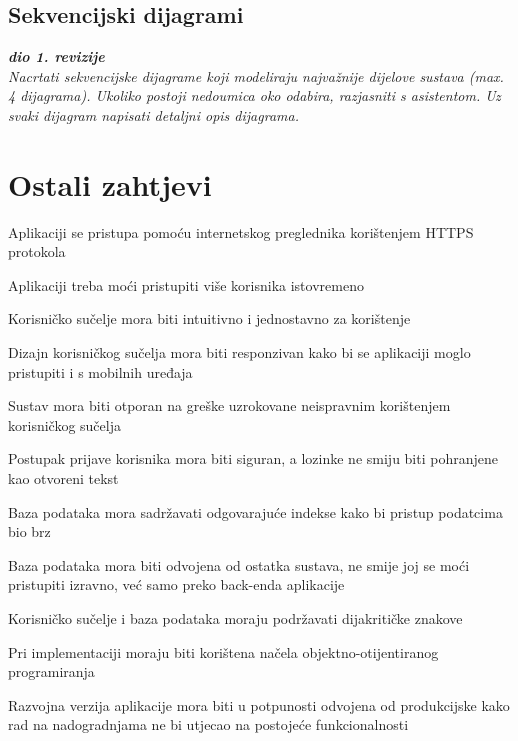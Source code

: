 			\subsection{Sekvencijski dijagrami}
				
				\textbf{\textit{dio 1. revizije}}\\
				
				\textit{Nacrtati sekvencijske dijagrame koji modeliraju najvažnije dijelove sustava (max. 4 dijagrama). Ukoliko postoji nedoumica oko odabira, razjasniti s asistentom. Uz svaki dijagram napisati detaljni opis dijagrama.}
				\eject
	
		\section{Ostali zahtjevi}
			 
			 \begin{packed_item}
			 	\item Aplikaciji se pristupa pomoću internetskog preglednika korištenjem HTTPS protokola
			 	\item Aplikaciji treba moći pristupiti više korisnika istovremeno
			 	\item Korisničko sučelje mora biti intuitivno i jednostavno za korištenje
			 	\item Dizajn korisničkog sučelja mora biti responzivan kako bi se aplikaciji moglo pristupiti i s mobilnih uređaja
			 	\item Sustav mora biti otporan na greške uzrokovane neispravnim korištenjem korisničkog sučelja
			 	\item Postupak prijave korisnika mora biti siguran, a lozinke ne smiju biti pohranjene kao otvoreni tekst
			 	\item Baza podataka mora sadržavati odgovarajuće indekse kako bi pristup podatcima bio brz
			 	\item Baza podataka mora biti odvojena od ostatka sustava, ne smije joj se moći pristupiti izravno, već samo preko back-enda aplikacije
			 	\item Korisničko sučelje i baza podataka moraju podržavati dijakritičke znakove
			 	\item Pri implementaciji moraju biti korištena načela objektno-otijentiranog programiranja
			 	\item Razvojna verzija aplikacije mora biti u potpunosti odvojena od produkcijske kako rad na nadogradnjama ne bi utjecao na postojeće funkcionalnosti
			 	
			 \end{packed_item}
			 \eject
			 
			 
			 
	